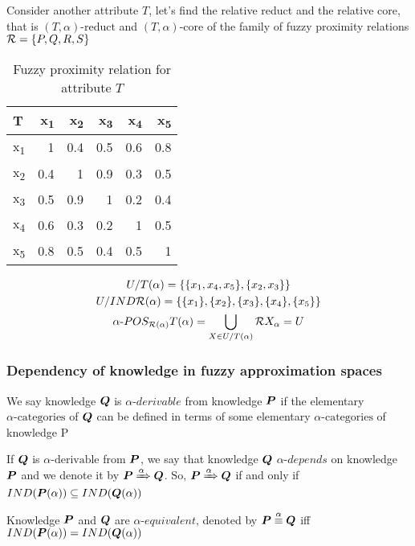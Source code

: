 \documentclass[11pt]{article}
\begin{document}
Consider another attribute \(T\), let's find the relative reduct and the
relative core, that is \((T,\alpha)\text{-reduct}\) and
\((T,\alpha)\text{-core}\) of the family of fuzzy proximity relations 
\(\mathcal{R}=\left\{ P,Q,R,S\right\}\)
\begin{table}[htbp]
\caption{Fuzzy proximity relation for attribute \(T\)}
\centering
\begin{tabular}{lrrrrr}
\hline
T & x\textsubscript{1} & x\textsubscript{2} & x\textsubscript{3} & x\textsubscript{4} & x\textsubscript{5}\\
\hline
x\textsubscript{1} & 1 & 0.4 & 0.5 & 0.6 & 0.8\\
x\textsubscript{2} & 0.4 & 1 & 0.9 & 0.3 & 0.5\\
x\textsubscript{3} & 0.5 & 0.9 & 1 & 0.2 & 0.4\\
x\textsubscript{4} & 0.6 & 0.3 & 0.2 & 1 & 0.5\\
x\textsubscript{5} & 0.8 & 0.5 & 0.4 & 0.5 & 1\\
\hline
\end{tabular}
\end{table}
\begin{gather*}
  U/T(\alpha)=\{\{x_1,x_4,x_5\},\{x_2,x_3\}\}\\
  U/IND\mathcal{R}(\alpha)=\{\{x_1\},\{x_2\},\{x_3\},\{x_4\},\{x_5\}\}\\
  \alpha\text{-}POS_{\mathcal{R}(\alpha)}T(\alpha)=
  \displaystyle\bigcup_{X\in U/T(\alpha)}\mathcal{R} X_\alpha=U
\end{gather*}
\subsubsection{Dependency of knowledge in fuzzy approximation spaces}
\label{sec:orgdce0e1f}
\begin{definition}[]
We say knowledge \(\boldsymbol{Q}\) is \(\alpha\textit{-derivable}\) from knowledge \(\boldsymbol{P}\) if
the elementary \(\alpha\text{-categories}\) of \(\boldsymbol{Q}\) can be defined in terms
of some elementary \(\alpha\text{-categories}\) of knowledge P
\end{definition}
\begin{definition}[]
If \(\boldsymbol{Q}\) is \(\alpha\text{-derivable}\) from \(\boldsymbol{P}\), we say that knowledge \(\boldsymbol{Q}\)
\(\alpha\textit{-depends}\) on knowledge \(\boldsymbol{P}\) and we denote it by
\(\boldsymbol{P}\xRightarrow{\alpha}\boldsymbol{Q}\). So, \(\boldsymbol{P}\xRightarrow{\alpha}\boldsymbol{Q}\) if and only
if \(IND(\boldsymbol{P}(\alpha))\subseteq IND(\boldsymbol{Q}(\alpha))\)
\end{definition}
\begin{definition}[]
Knowledge \(\boldsymbol{P}\) and \(\boldsymbol{Q}\) are \(\alpha\textit{-equivalent}\), denoted by 
\(\boldsymbol{P}\stackrel{\alpha}{\equiv}\boldsymbol{Q}\) iff \(IND(\boldsymbol{P}(\alpha))=IND(\boldsymbol{Q}(\alpha))\)
\end{definition}
\end{document}
